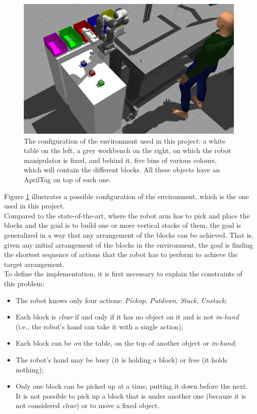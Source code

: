 \begin{figure} [h]
\centering
\includegraphics[width=1.0
\textwidth]{figures/Magistrale/env_fin_1}
\caption[Environment Configuration]{The configuration of the environment used in this project: a white table on the left, a grey workbench on the right, on which the robot manipulator is fixed, and behind it, five bins of various colours, which will contain the different blocks. All these objects have an AprilTag on top of each one.
\label{fig:env_1}}
\end{figure} 

Figure \ref{fig:env_1} illustrates a possible configuration of the environment, which is the one used in this project. \\
Compared to the state-of-the-art, where the robot arm has to pick and place the blocks and the goal is to build one or more vertical stacks of them, the goal is generalized in a way that any arrangement of the blocks can be achieved. 
That is, given any initial arrangement of the blocks in the environment, the goal is finding the shortest sequence of actions that the robot has to perform to achieve the target arrangement. \\
To define the implementation, it is first necessary to explain the constraints of this problem:

\begin{itemize}
	\item The robot knows only four actions: \textit{Pickup}, \textit{Putdown}, \textit{Stack}, \textit{Unstack};
	\item Each block is \textit{clear} if and only if it has no object on it and is not \textit{in-hand} (i.e., the robot's hand can take it with a single action);
	\item Each block can be \textit{on} the table, on the top of another object or \textit{in-hand};
	\item The robot's hand may be busy (it is holding a block) or free (it holds nothing);
	\item Only one block can be picked up at a time, putting it down before the next. It is not possible to pick up a block that is under another one (because it is not considered \textit{clear}) or to move a fixed object.
\end{itemize}

